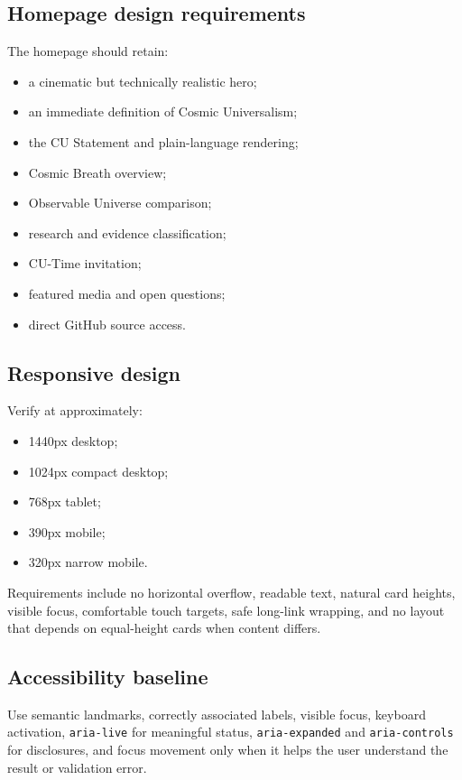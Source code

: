 \documentclass[11pt,letterpaper]{article}
\begin{document}
\subsection{Homepage design requirements}

The homepage should retain:

\begin{itemize}
    \item a cinematic but technically realistic hero;
    \item an immediate definition of Cosmic Universalism;
    \item the CU Statement and plain-language rendering;
    \item Cosmic Breath overview;
    \item Observable Universe comparison;
    \item research and evidence classification;
    \item CU-Time invitation;
    \item featured media and open questions;
    \item direct GitHub source access.
\end{itemize}

\subsection{Responsive design}

Verify at approximately:

\begin{itemize}
    \item 1440px desktop;
    \item 1024px compact desktop;
    \item 768px tablet;
    \item 390px mobile;
    \item 320px narrow mobile.
\end{itemize}

Requirements include no horizontal overflow, readable text, natural card
heights, visible focus, comfortable touch targets, safe long-link wrapping, and
no layout that depends on equal-height cards when content differs.

\subsection{Accessibility baseline}

Use semantic landmarks, correctly associated labels, visible focus, keyboard
activation, \texttt{aria-live} for meaningful status, \texttt{aria-expanded}
and \texttt{aria-controls} for disclosures, and focus movement only when it
helps the user understand the result or validation error.
\end{document}
